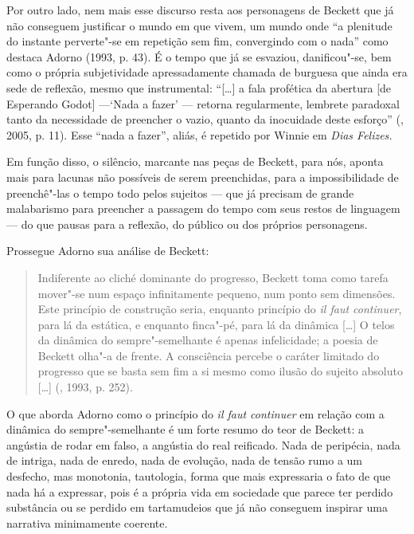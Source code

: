 Por outro lado, nem mais esse discurso resta aos personagens de Beckett
que já não conseguem justificar o mundo em que vivem, um mundo onde ``a
plenitude do instante perverte"-se em repetição sem fim, convergindo com
o nada'' como destaca Adorno (1993, p. 43). É o tempo que já se
esvaziou, danificou"-se, bem como o própria subjetividade apressadamente
chamada de burguesa que ainda era sede de reflexão, mesmo que
instrumental: ``[\ldots{}] a fala profética da abertura [de Esperando
Godot] ---`Nada a fazer' --- retorna regularmente, lembrete paradoxal
tanto da necessidade de preencher o vazio, quanto da inocuidade deste
esforço'' (, 2005, p. 11). Esse ``nada a fazer'', aliás, é repetido por Winnie em \emph{Dias Felizes.}

Em função disso, o silêncio, marcante nas peças de Beckett, para nós,
aponta mais para lacunas não possíveis de serem preenchidas, para a
impossibilidade de preenchê"-las o tempo todo pelos sujeitos --- que já
precisam de grande malabarismo para preencher a passagem do tempo com
seus restos de linguagem --- do que pausas para a reflexão, do público ou
dos próprios personagens.

Prossegue Adorno sua análise de Beckett:

\begin{quote}
Indiferente ao cliché dominante do progresso, Beckett toma como tarefa
mover"-se num espaço infinitamente pequeno, num ponto sem dimensões. Este
princípio de construção seria, enquanto princípio do \emph{il faut
continuer}, para lá da estática, e enquanto finca"-pé, para lá da
dinâmica [\ldots{}] O telos da dinâmica do sempre"-semelhante é
apenas infelicidade; a poesia de Beckett olha"-a de frente. A consciência
percebe o caráter limitado do progresso que se basta sem fim a si mesmo
como ilusão do sujeito absoluto [\ldots{}] (, 1993, p. 252).
\end{quote}

O que aborda Adorno como o princípio do \emph{il faut continuer} em
relação com a dinâmica do sempre"-semelhante é um forte resumo do teor de
Beckett: a angústia de rodar em falso, a angústia do real reificado.
Nada de peripécia, nada de intriga, nada de enredo, nada de evolução,
nada de tensão rumo a um desfecho, mas monotonia, tautologia, forma que
mais expressaria o fato de que nada há a expressar, pois é a própria
vida em sociedade que parece ter perdido substância ou se perdido em
tartamudeios que já não conseguem inspirar uma narrativa minimamente coerente.

